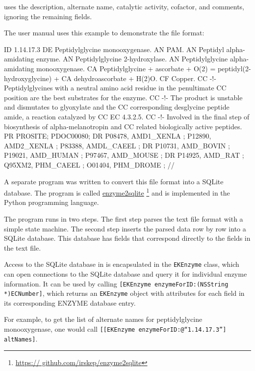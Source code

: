 \keggapp uses the description, alternate name, catalytic activity, cofactor, and
comments, ignoring the remaining fields.

The user manual uses this example to demonstrate the file format:

\begin{objc}
ID   1.14.17.3
DE   Peptidylglycine monooxygenase.
AN   PAM.
AN   Peptidyl alpha-amidating enzyme.
AN   Peptidylglycine 2-hydroxylase.
AN   Peptidylglycine alpha-amidating monooxygenase.
CA   Peptidylglycine + ascorbate + O(2) = peptidyl(2-hydroxyglycine) +
CA   dehydroascorbate + H(2)O.
CF   Copper.
CC   -!- Peptidylglycines with a neutral amino acid residue in the penultimate
CC       position are the best substrates for the enzyme.
CC   -!- The product is unstable and dismutates to glyoxylate and the
CC       corresponding desglycine peptide amide, a reaction catalyzed by
CC       EC 4.3.2.5.
CC   -!- Involved in the final step of biosynthesis of alpha-melanotropin and
CC       related biologically active peptides.
PR   PROSITE; PDOC00080;
DR   P08478, AMD1_XENLA ;  P12890, AMD2_XENLA ;  P83388, AMDL_CAEEL ;
DR   P10731, AMD_BOVIN  ;  P19021, AMD_HUMAN  ;  P97467, AMD_MOUSE  ;
DR   P14925, AMD_RAT    ;  Q95XM2, PHM_CAEEL  ;  O01404, PHM_DROME  ;
//
\end{objc}

A separate program was written to convert this file format into a SQLite
database. The program is called
\href{https://github.com/irskep/enzyme2sqlite}{enzyme2sqlite}
\footnote{\href{https://github.com/irskep/enzyme2sqlite}{https:/\slash
github.com\slash irskep\slash enzyme2sqlite}} and is implemented in the Python
programming language.

The program runs in two steps. The first step parses the text file format with a
simple state machine. The second step inserts the parsed data row by row
into a SQLite database. This database has fields that correspond directly to the
fields in the text file.

Access to the SQLite database in \keggapp is encapsulated in the
\texttt{EKEnzyme} class, which can open connections to the SQLite database and
query it for individual enzyme information. It can be used by calling
\texttt{[EKEnzyme enzymeForID:(NSString *)ECNumber]}, which returns an
\texttt{EKEnzyme} object with attributes for each field in its corresponding
ENZYME database entry.

For example, to get the list of alternate names for peptidylglycine
monooxygenase, one would call \texttt{[[EKEnzyme enzymeForID:@``1.14.17.3'']
altNames]}.

